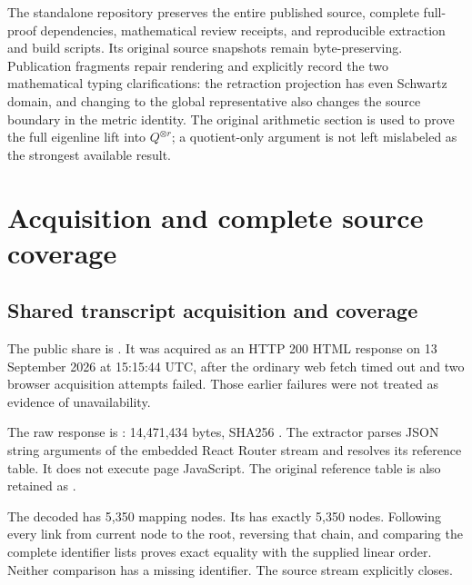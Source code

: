 The standalone repository preserves the entire published source,
complete full-proof dependencies, mathematical review receipts, and
reproducible extraction and build scripts. Its original source snapshots
remain byte-preserving. Publication fragments repair rendering and
explicitly record the two mathematical typing clarifications: the
retraction projection has even Schwartz domain, and changing to the
global representative also changes the source boundary in the metric
identity. The original arithmetic section is used to prove the full
eigenline lift into \(Q^{\otimes r}\); a quotient-only argument is not
left mislabeled as the strongest available result.

\clearpage

\section{Acquisition and complete source
coverage}\label{acquisition-and-complete-source-coverage}

\subsection{Shared transcript acquisition and
coverage}\label{shared-transcript-acquisition-and-coverage}

The public share is
\href{https://chatgpt.com/share/6aa6bc6e-98cc-83eb-9343-e811c26d6631}{\protect{}}.
It was acquired as an HTTP 200 HTML response on 13 September 2026 at
15:15:44 UTC, after the ordinary web fetch timed out and two browser
acquisition attempts failed. Those earlier failures were not treated as
evidence of unavailability.

The raw response is \protect{}: 14,471,434 bytes,
SHA256
\protect{}.
The extractor parses JSON string arguments of the embedded React Router
stream and resolves its reference table. It does not execute page
JavaScript. The original reference table is also retained as
\protect{}.

The decoded \protect{} has 5,350 mapping
nodes. Its \protect{} has exactly 5,350 nodes.
Following every \protect{} link from current node
\protect{} to the root,
reversing that chain, and comparing the complete identifier lists proves
exact equality with the supplied linear order. Neither comparison has a
missing identifier. The source stream explicitly closes.

